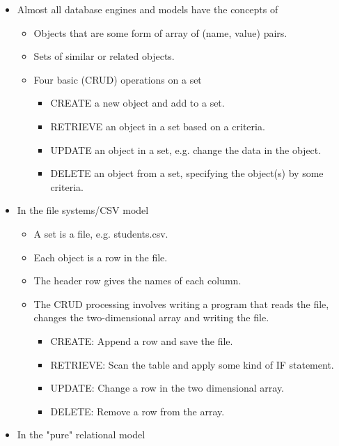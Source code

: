 \documentclass[11pt]{article}
\providecommand{\tightlist}{%
      \setlength{\itemsep}{0pt}\setlength{\parskip}{0pt}}
\begin{document}
\begin{itemize}
\tightlist
\item
  Almost all database engines and models have the concepts of

  \begin{itemize}
  \tightlist
  \item
    Objects that are some form of array of (name, value) pairs.
  \item
    Sets of similar or related objects.
  \item
    Four basic (CRUD) operations on a set

    \begin{itemize}
    \tightlist
    \item
      CREATE a new object and add to a set.
    \item
      RETRIEVE an object in a set based on a criteria.
    \item
      UPDATE an object in a set, e.g. change the data in the object.
    \item
      DELETE an object from a set, specifying the object(s) by some
      criteria.
    \end{itemize}
  \end{itemize}
\item
  In the file systems/CSV model

  \begin{itemize}
  \tightlist
  \item
    A set is a file, e.g. students.csv.
  \item
    Each object is a row in the file.
  \item
    The header row gives the names of each column.
  \item
    The CRUD processing involves writing a program that reads the file,
    changes the two-dimensional array and writing the file.

    \begin{itemize}
    \tightlist
    \item
      CREATE: Append a row and save the file.
    \item
      RETRIEVE: Scan the table and apply some kind of IF statement.
    \item
      UPDATE: Change a row in the two dimensional array.
    \item
      DELETE: Remove a row from the array.
    \end{itemize}
  \end{itemize}
\item
  In the "pure" relational model


\end{itemize}
\end{document}
